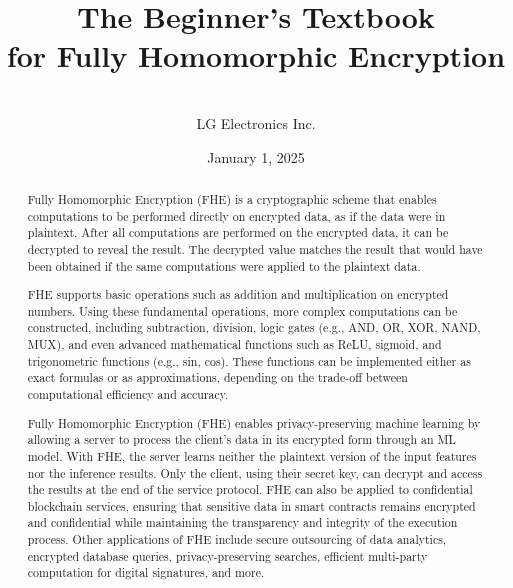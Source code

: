 \documentclass[11pt]{article}
\begin{document}
\title{\Huge{\textbf{The Beginner's Textbook}}\\ \Huge{\textbf{for Fully Homomorphic Encryption}}}
\author{\textbf{}\\{LG Electronics Inc.}}%
\date{January 1, 2025}



\begin{titlingpage}
\maketitle
\end{titlingpage}


\clearpage

\begin{abstract}
Fully Homomorphic Encryption (FHE) is a cryptographic scheme that enables computations to be performed directly on encrypted data, as if the data were in plaintext. After all computations are performed on the encrypted data, it can be decrypted to reveal the result. The decrypted value matches the result that would have been obtained if the same computations were applied to the plaintext data.

FHE supports basic operations such as addition and multiplication on encrypted numbers. Using these fundamental operations, more complex computations can be constructed, including subtraction, division, logic gates (e.g., AND, OR, XOR, NAND, MUX), and even advanced mathematical functions such as ReLU, sigmoid, and trigonometric functions (e.g., sin, cos). These functions can be implemented either as exact formulas or as approximations, depending on the trade-off between computational efficiency and accuracy. 

Fully Homomorphic Encryption (FHE) enables privacy-preserving machine learning by allowing a server to process the client’s data in its encrypted form through an ML model. With FHE, the server learns neither the plaintext version of the input features nor the inference results. Only the client, using their secret key, can decrypt and access the results at the end of the service protocol.
FHE can also be applied to confidential blockchain services, ensuring that sensitive data in smart contracts remains encrypted and confidential while maintaining the transparency and integrity of the execution process.
Other applications of FHE include secure outsourcing of data analytics, encrypted database queries, privacy-preserving searches, efficient multi-party computation for digital signatures, and more.


\end{abstract}
\end{document}
